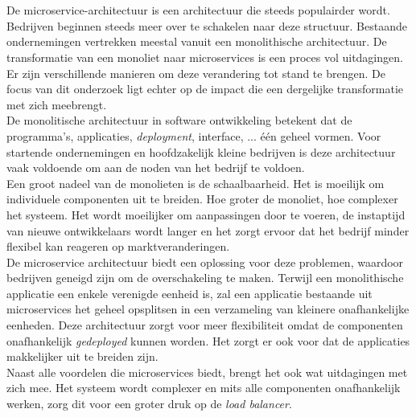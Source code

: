 
\chapter{}
\label{ch:inleiding}

De microservice-architectuur is een architectuur die steeds populairder wordt. Bedrijven beginnen steeds meer over te schakelen naar deze structuur. Bestaande ondernemingen vertrekken meestal vanuit een monolithische architectuur. De transformatie van een monoliet naar microservices is een proces vol uitdagingen. Er zijn verschillende manieren om deze verandering tot stand te brengen. De focus van dit onderzoek ligt echter op de impact die een dergelijke transformatie met zich meebrengt.\\

De monolitische architectuur in software ontwikkeling betekent dat de programma's, applicaties, \emph{deployment}, interface, ... één geheel vormen. Voor startende ondernemingen en hoofdzakelijk kleine bedrijven is deze architectuur vaak voldoende om aan de noden van het bedrijf te voldoen.\\

Een groot nadeel van de monolieten is de schaalbaarheid. Het is moeilijk om individuele componenten uit te breiden. Hoe groter de monoliet, hoe complexer het systeem. Het wordt moeilijker om aanpassingen door te voeren, de instaptijd van nieuwe ontwikkelaars wordt langer en het zorgt ervoor dat het bedrijf minder flexibel kan reageren op marktveranderingen.\\

De microservice architectuur biedt een oplossing voor deze problemen, waardoor bedrijven geneigd zijn om de overschakeling te maken. Terwijl een monolithische applicatie een enkele verenigde eenheid is, zal een applicatie bestaande uit microservices het geheel opsplitsen in een verzameling van kleinere onafhankelijke eenheden. Deze architectuur zorgt voor meer flexibiliteit omdat de componenten onafhankelijk \emph{gedeployed} kunnen worden. Het zorgt er ook voor dat de applicaties makkelijker uit te breiden zijn. \\

Naast alle voordelen die microservices biedt, brengt het ook wat uitdagingen met zich mee. Het systeem wordt complexer en mits alle componenten onafhankelijk werken, zorg dit voor een groter druk op de \emph{load balancer}.

